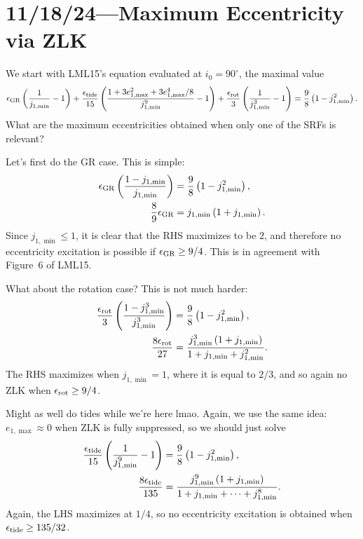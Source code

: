 \documentclass[12pt]{article}
\newcommand*{\p}[1]{\left(#1\right)}
\newcommand*{\z}[1]{\left\{#1\right\}}
\begin{document}
\section{11/18/24---Maximum Eccentricity via ZLK}

We start with LML15's equation evaluated at $i_0 = 90^\circ$, the maximal value
\begin{align}
    \epsilon_{\rm GR} \p{\frac{1}{j_{1,\min}} - 1}
        + \frac{\epsilon_{\rm tide}}{15}
            \p{\frac{1 + 3e_{1,\max}^2 + 3e_{1,\max}^4/8}{j_{1,\min}^9} - 1}
        + \frac{\epsilon_{\rm rot}}{3}
            \p{\frac{1}{j_{1,\min}^3} - 1}
        = \frac{9}{8}\p{1 - j_{1,\min}^2}.
\end{align}
What are the maximum eccentricities obtained when only one of the SRFs is
relevant?

Let's first do the GR case. This is simple:
\begin{align}
    \epsilon_{\rm GR} \p{\frac{1 - j_{1, \min}}{j_{1,\min}}}
        &= \frac{9}{8} \p{1 - j_{1,\min}^2},\\
    \frac{8}{9}\epsilon_{\rm GR}
        &= j_{1,\min}\p{1 + j_{1,\min}}.
\end{align}
Since $j_{1,\min} \leq 1$, it is clear that the RHS maximizes to be $2$, and
therefore no eccentricity excitation is possible if $\epsilon_{\rm GR} \geq
9/4$. This is in agreement with Figure~6 of LML15.

What about the rotation case? This is not much harder:
\begin{align}
    \frac{\epsilon_{\rm rot}}{3} \p{\frac{1 - j_{1,\min}^3}{j_{1,\min}^3}}
        &= \frac{9}{8}\p{1 - j_{1,\min}^2},\\
    \frac{8\epsilon_{\rm rot}}{27}
        &= \frac{j_{1,\min}^3\p{1 + j_{1,\min}}}{1 + j_{1,\min} + j_{1,\min}^2}.
\end{align}
The RHS maximizes when $j_{1,\min} = 1$, where it is equal to $2/3$, and so
again no ZLK when $\epsilon_{\rm rot} \geq 9/4$.

Might as well do tides while we're here lmao. Again, we use the same idea:
$e_{1, \max} \approx 0$ when ZLK is fully suppressed, so we should just solve
\begin{align}
    \frac{\epsilon_{\rm tide}}{15}\p{\frac{1}{j_{1,\min}^9} - 1}
        &= \frac{9}{8}\p{1 - j_{1,\min}^2},\\
    \frac{8\epsilon_{\rm tide}}{135}
        &= \frac{j_{1,\min}^9\p{1 + j_{1,\min}}}{
            1 + j_{1,\min} +\dots+ j_{1,\min}^8}.
\end{align}
Again, the LHS maximizes at $1/4$, so no eccentricity excitation is obtained
when $\epsilon_{\rm tide} \geq 135/32$.
\end{document}
